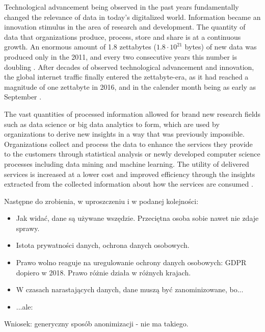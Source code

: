 \documentclass[a4paper,twoside,12pt]{book}
\begin{document}
Technological advancement being observed in the past years fundamentally changed the relevance of data in today's digitalized world. Information became an innovation stimulus in the area of research and development. The quantity of data that organizations produce, process, store and share is at a continuous growth. An enormous amount of 1.8 zettabytes ($1.8 \cdot 10^{21}$ bytes) of new data was produced only in the 2011, and every two consecutive years this number is doubling \cite{bib:big_data_security}. After decades of observed technological advancement and innovation, the global internet traffic finally entered the zettabyte-era, as it had reached a magnitude of one zettabyte in 2016, and in the calender month being as early as September \cite{bib:cisco_blog}.

The vast quantities of processed information allowed for brand new research fields such as data science or big data analytics to form, which are used by organizations to derive new insights in a way that was previously impossible. Organizations collect and process the data to enhance the services they provide to the customers through statistical analysis or newly developed computer science processes including data mining and machine learning. The utility of delivered services is increased at a lower cost and improved efficiency through the insights extracted from the collected information about how the services are consumed \cite{bib:anonymization_pipeline}.


\vfill

\footnotesize
\color{blue}
Następne do zrobienia, w uproszczeniu i w podanej kolejności:
\begin{itemize}
\item Jak widać, dane są używane wszędzie. Przeciętna osoba sobie nawet nie zdaje sprawy.
\item Istota prywatności danych, ochrona danych osobowych.
\item Prawo wolno reaguje na uregulowanie ochrony danych osobowych: GDPR dopiero w 2018. Prawo różnie działa w różnych krajach.
\item W czasach narastających danych, dane muszą być zanominizowane, bo...
\item ...ale:
\end{itemize}

\normalsize
\color{black}

\footnotesize
\color{blue}
Wniosek: generyczny sposób anonimizacji - nie ma takiego.
\end{document}
